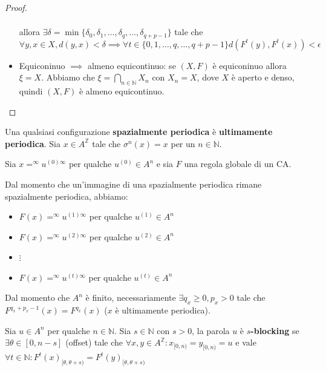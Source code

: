 \begin{teorema}
\begin{proof}
\begin{itemize}
\begin{equation*}
\begin{array}{cl}
                      \end{array}
                  \end{equation*}
                  allora $\exists \delta = \min \{\delta_0,\delta_1, \dots, \delta_q,\dots, \delta_{q+p-1}\}$ tale che
                  $$\forall y, x\in X, d(y,x) < \delta \implies \forall t\in \{0,1,\dots,q,\dots,q+p-1\} d(F^t(y),F^t(x))< \epsilon $$
            \item Equiconinuo $\implies$ almeno equicontinuo: se $(X ,F)$ è equiconinuo
                allora $\xi = X$.  Abbiamo che $\xi = \bigcap_{n\in \mathbb{N}}X_n$ con $X_n= X$,
                dove $X$ è aperto e denso, quindi $(X,F)$ è almeno equicontinuo.
        \end{itemize}
    \end{proof}
\end{teorema}

\begin{nota}
    Una qualsiasi configurazione \textbf{spazialmente periodica} è \textbf{ultimamente periodica}.
    Sia $x\in A^\mathbb{Z}$ tale che $\sigma ^n(x)=x$ per un $n\in \mathbb{N}$.

    Sia $x=^\infty u^{(0)\infty}$ per qualche $u^{(0)}\in  A^n$ e sia $F$ una regola 
    globale di un CA. 

    Dal momento che un'immagine di una spazialmente periodica rimane spazialmente periodica,
    abbiamo:
    \begin{itemize}
        \item $F(x)=^\infty u^{(1)\infty}$ per qualche $u^{(1)}\in  A^n$
        \item $F(x)=^\infty u^{(2)\infty}$ per qualche $u^{(2)}\in  A^n$
        \item $\vdots$
        \item $F(x)=^\infty u^{(t)\infty}$ per qualche $u^{(t)}\in  A^n$
    \end{itemize}
    Dal momento che $A^n$ è finito, necessariamente $\exists q_x\ge 0, p_x> 0$ 
    tale che $F^{q_x+p_x-1}(x)=F^{q_x}(x)$ ($x$ è ultimamente periodica).
\end{nota}
\begin{definizione}
    Sia $u\in A^n$ per qualche $n\in \mathbb{N}$. Sia $s\in \mathbb{N}$ con $s>0$,
    la parola $u$ è $s$\textbf{-blocking} se $\exists \theta\in [0,n-s]$ (offset)
    tale che $\forall x,y\in A^\mathbb{Z}:x_{[0,n)}=y_{[0,n)}=u$ e vale $\forall t\in \mathbb{N}:
    F^t(x)_{[\theta,\theta +s)} =F^t(y)_{[\theta,\theta +s)}$
\end{definizione}

